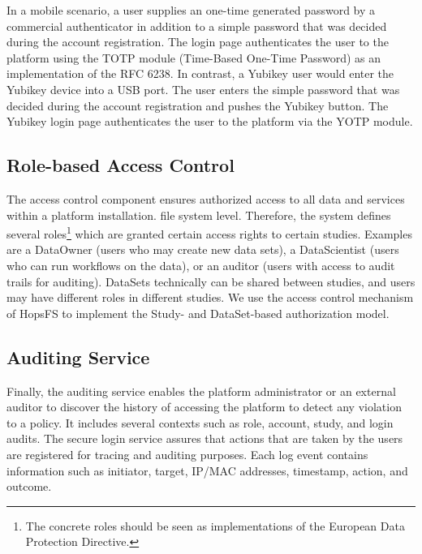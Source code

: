 In a mobile scenario, a user supplies an one-time generated password by a commercial authenticator in addition to a simple password that was decided during the account registration. The login page authenticates the user to the platform using the TOTP module (Time-Based One-Time Password) as an implementation of the RFC 6238.  In contrast, a Yubikey user would enter the Yubikey device into a USB port. The user enters the simple password that was decided during the account registration and pushes the Yubikey button. The Yubikey login page authenticates the user to the platform via the YOTP module.

\subsection {Role-based Access Control}

The access control component ensures authorized access to all data and services within a platform installation. file system level. Therefore, the system defines several roles\footnote{The concrete roles should be seen as implementations of the European Data Protection Directive.} which are granted certain access rights to certain studies. Examples are a DataOwner (users who may create new data sets), a DataScientist (users who can run workflows on the data), or an auditor (users with access to audit trails for auditing). DataSets technically can be shared between studies, and users may have different roles in different studies. We use the access control mechanism of HopsFS to implement the Study- and DataSet-based authorization model. 

\subsection {Auditing Service}
Finally, the auditing service enables the platform administrator or an external auditor to discover the history of accessing the platform to detect any violation to a policy. It includes several contexts such as role, account, study, and login audits. The secure login service assures that actions that are taken by the users are registered for tracing and auditing purposes. Each log event contains information such as initiator, target, IP/MAC addresses, timestamp, action, and outcome.
